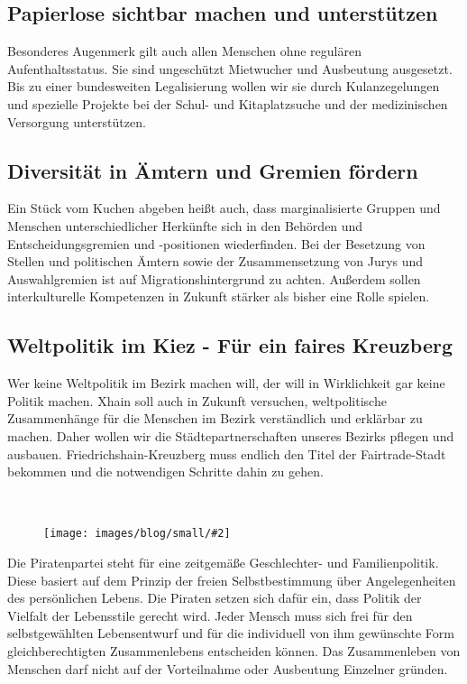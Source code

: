 \documentclass[a4paper,10pt]{article}
\newcommand{\mysection}[1]{{\vspace{1cm}\noindent\color{gray}{\ttfamily\LARGE\raggedright #1}\\\medskip}}
\newcommand{\abschnitt}[2]{%
\mysection{\raggedright #1}%
\begin{figure}[t]%
\vspace*{-2.7cm}%
\hspace*{-2.1cm}%
\texttt{[image: images/blog/small/\#2]} %
\end{figure}%
}
\newcommand{\bottomfigure}[1]{
\parbox{5cm}{
\vspace*{1cm}%
\texttt{[image: ./images/blog/small/\#1]}
}
}
\begin{document}
\subsection*{\ttfamily Papierlose sichtbar machen und
unterstützen}\label{papierlose-sichtbar-machen-und-unterstuxfctzen}

Besonderes Augenmerk gilt auch allen Menschen ohne regulären
Aufenthaltsstatus. Sie sind ungeschützt Mietwucher und Ausbeutung
ausgesetzt. Bis zu einer bundesweiten Legalisierung wollen wir sie durch
Kulanzegelungen und spezielle Projekte bei der Schul- und Kitaplatzsuche
und der medizinischen Versorgung unterstützen.

\subsection*{\ttfamily Diversität in Ämtern und Gremien
fördern}\label{diversituxe4t-in-uxe4mtern-und-gremien-fuxf6rdern}

Ein Stück vom Kuchen abgeben heißt auch, dass marginalisierte Gruppen
und Menschen unterschiedlicher Herkünfte sich in den Behörden und
Entscheidungsgremien und -positionen wiederfinden. Bei der Besetzung von
Stellen und politischen Ämtern sowie der Zusammensetzung von Jurys und
Auswahlgremien ist auf Migrationshintergrund zu achten. Außerdem sollen
interkulturelle Kompetenzen in Zukunft stärker als bisher eine Rolle
spielen.

\subsection*{\ttfamily Weltpolitik im Kiez - Für ein faires
Kreuzberg}\label{weltpolitik-im-kiez---fuxfcr-ein-faires-kreuzberg}

Wer keine Weltpolitik im Bezirk machen will, der will in Wirklichkeit
gar keine Politik machen. Xhain soll auch in Zukunft versuchen,
weltpolitische Zusammenhänge für die Menschen im Bezirk verständlich und
erklärbar zu machen. Daher wollen wir die Städtepartnerschaften unseres
Bezirks pflegen und ausbauen. Friedrichshain-Kreuzberg muss endlich den
Titel der Fairtrade-Stadt bekommen und die notwendigen Schritte dahin zu
gehen.


\clearpage
\abschnitt{\raggedright Geschlechter- {\raisebox{-.5cm}{~}} und 
\mbox{Familienpolitik}}{MutterMutterKind.png}

Die Piratenpartei steht für eine zeitgemäße Geschlechter- und
Familienpolitik. Diese basiert auf dem Prinzip der freien
Selbstbestimmung über Angelegenheiten des persönlichen Lebens. Die
Piraten setzen sich dafür ein, dass Politik der Vielfalt der Lebensstile
gerecht wird. Jeder Mensch muss sich frei für den selbstgewählten
Lebensentwurf und für die individuell von ihm gewünschte Form
gleichberechtigten Zusammenlebens entscheiden können. Das Zusammenleben
von Menschen darf nicht auf der Vorteilnahme oder Ausbeutung Einzelner
gründen.
\end{document}
